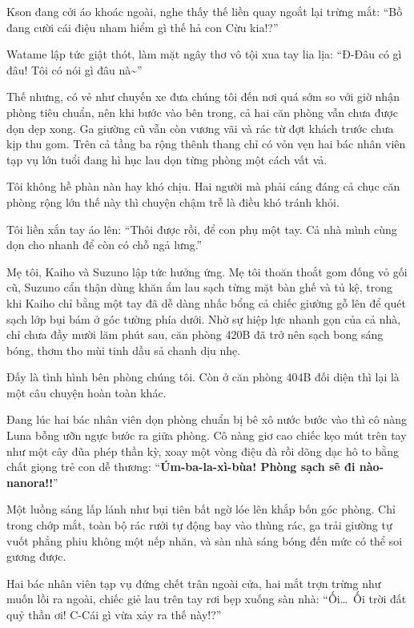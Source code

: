 \documentclass[../main.tex]{subfiles}
\begin{document}
Kson đang cởi áo khoác ngoài, nghe thấy thế liền quay ngoắt lại trừng mắt: ``Bồ đang cười cái điệu nham hiểm gì thế hả con Cừu kia!?''

Watame lập tức giật thót, làm mặt ngây thơ vô tội xua tay lia lịa: ``Đ-Đâu có gì đâu! Tôi có nói gì đâu nà\~{}''

Thế nhưng, có vẻ như chuyến xe đưa chúng tôi đến nơi quá sớm so với giờ nhận phòng tiêu chuẩn, nên khi bước vào bên trong, cả hai căn phòng vẫn chưa được dọn dẹp xong. Ga giường cũ vẫn còn vương vãi và rác từ đợt khách trước chưa kịp thu gom. Trên cả tầng ba rộng thênh thang chỉ có vỏn vẹn hai bác nhân viên tạp vụ lớn tuổi đang hì hục lau dọn từng phòng một cách vất vả.

Tôi không hề phàn nàn hay khó chịu. Hai người mà phải cáng đáng cả chục căn phòng rộng lớn thế này thì chuyện chậm trễ là điều khó tránh khỏi.

Tôi liền xắn tay áo lên: ``Thôi được rồi, để con phụ một tay. Cả nhà mình cùng dọn cho nhanh để còn có chỗ ngả lưng.''

Mẹ tôi, Kaiho và Suzuno lập tức hưởng ứng. Mẹ tôi thoăn thoắt gom đống vỏ gối cũ, Suzuno cẩn thận dùng khăn ẩm lau sạch từng mặt bàn ghế và tủ kệ, trong khi Kaiho chỉ bằng một tay đã dễ dàng nhấc bổng cả chiếc giường gỗ lên để quét sạch lớp bụi bám ở góc tường phía dưới. Nhờ sự hiệp lực nhanh gọn của cả nhà, chỉ chưa đầy mười lăm phút sau, căn phòng 420B đã trở nên sạch bong sáng bóng, thơm tho mùi tinh dầu sả chanh dịu nhẹ.

Đấy là tình hình bên phòng chúng tôi. Còn ở căn phòng 404B đối diện thì lại là một câu chuyện hoàn toàn khác.

Đang lúc hai bác nhân viên dọn phòng chuẩn bị bê xô nước bước vào thì cô nàng Luna bỗng ưỡn ngực bước ra giữa phòng. Cô nàng giơ cao chiếc kẹo mút trên tay như một cây đũa phép thần kỳ, xoay một vòng điệu đà rồi dõng dạc hô to bằng chất giọng trẻ con dễ thương: ``\textbf{Úm-ba-la-xì-bùa! Phòng sạch sẽ đi nào-nanora!!}''

Một luồng sáng lấp lánh như bụi tiên bất ngờ lóe lên khắp bốn góc phòng. Chỉ trong chớp mắt, toàn bộ rác rưởi tự động bay vào thùng rác, ga trải giường tự vuốt phẳng phiu không một nếp nhăn, và sàn nhà sáng bóng đến mức có thể soi gương được.

Hai bác nhân viên tạp vụ đứng chết trân ngoài cửa, hai mắt trợn trừng như muốn lồi ra ngoài, chiếc giẻ lau trên tay rơi bẹp xuống sàn nhà: ``Ối\dots\ Ối trời đất quỷ thần ơi! C-Cái gì vừa xảy ra thế này!?''
\end{document}
